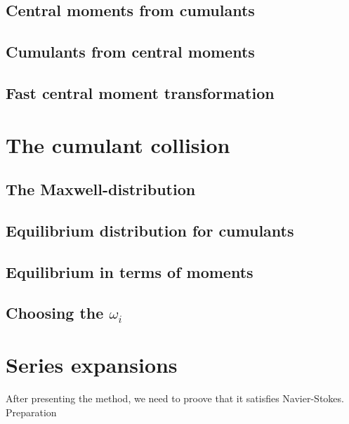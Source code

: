 \documentclass[12pt,a4paper,twoside]{article}
\begin{document}
\subsection{Central moments from cumulants}
\label{sub:Central moments from cumulants}

\subsection{Cumulants from central moments}
\label{sub:Cumulants from central moments}

\subsection{Fast central moment transformation}
\label{sub:Fast central moment transformation}

\section{The cumulant collision}
\label{sec:The cumulant collision}

\subsection{The Maxwell-distribution}
\label{sub:The Maxwell-distribution}

\subsection{Equilibrium distribution for cumulants}
\label{sub:Equilibrium distribution for cumulants}

\subsection{Equilibrium in terms of moments}
\label{sub:Equilibrium in terms of moments}

\subsection{Choosing the \texorpdfstring{$\omega_i$}{omega i}}
\label{sub:Choosing the omega i}

\section{Series expansions}
\label{sec:Series expansions}
After presenting the method, we need to proove that it satisfies Navier-Stokes.
Preparation
\end{document}
